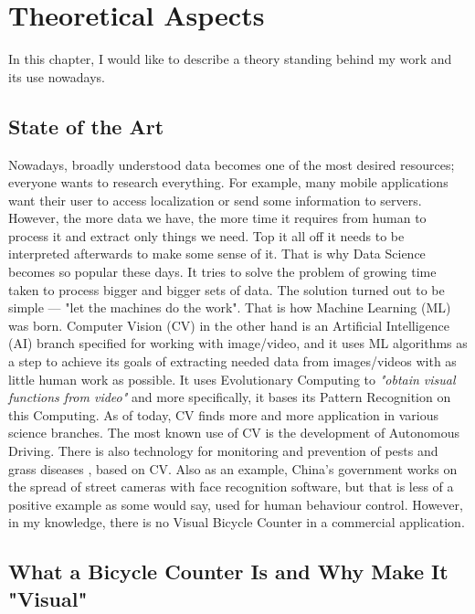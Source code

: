\chapter{Theoretical Aspects}
\label{cha:theorethicalAspects}

In this chapter, I would like to describe a theory standing behind my work and its use nowadays.

\section{State of the Art}
\label{sec:stateOfTheArt}

Nowadays, broadly understood data becomes one of the most desired resources; everyone wants to research everything. For example, many mobile applications want their user to access localization or send some information to servers. However, the more data we have, the more time it requires from human to process it and extract only things we need. Top it all off it needs to be interpreted afterwards to make some sense of it. That is why Data Science \cite{dataScience} becomes so popular these days. It tries to solve the problem of growing time taken to process bigger and bigger sets of data. The solution turned out to be simple --- "let the machines do the work". That is how Machine Learning (ML) was born. Computer Vision \cite{cv} (CV) in the other hand is an Artificial Intelligence (AI) branch specified for working with image/video, and it uses ML algorithms as a step to achieve its goals of extracting needed data from images/videos with as little human work as possible. It uses Evolutionary Computing \cite{cv} to \textit{"obtain visual functions from video"} \cite{cv} and more specifically, it bases its Pattern Recognition \cite{cv} on this Computing. As of today, CV finds more and more application in various science branches. The most known use of CV is the development of Autonomous Driving. There is also technology for monitoring and prevention of pests and grass diseases \cite{appResearch}, based on CV. Also as an example, China's government works on the spread of street cameras with face recognition software, but that is less of a positive example as some would say, used for human behaviour control. However, in my knowledge, there is no Visual Bicycle Counter in a commercial application.

\section{What a Bicycle Counter Is and Why Make It "Visual"}
\label{sec:why}

